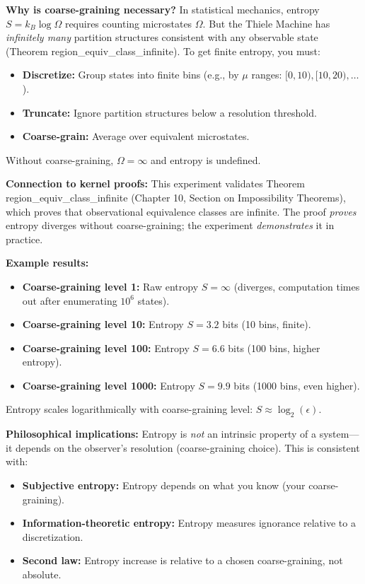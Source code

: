 \textbf{Why is coarse-graining necessary?} In statistical mechanics, entropy $S = k_B \log \Omega$ requires counting microstates $\Omega$. But the Thiele Machine has \textit{infinitely many} partition structures consistent with any observable state (Theorem region\_equiv\_class\_infinite). To get finite entropy, you must:
\begin{itemize}
    \item \textbf{Discretize:} Group states into finite bins (e.g., by $\mu$ ranges: $[0,10), [10,20), \ldots$).
    \item \textbf{Truncate:} Ignore partition structures below a resolution threshold.
    \item \textbf{Coarse-grain:} Average over equivalent microstates.
\end{itemize}
Without coarse-graining, $\Omega = \infty$ and entropy is undefined.

\textbf{Connection to kernel proofs:} This experiment validates Theorem region\_equiv\_class\_infinite (Chapter 10, Section on Impossibility Theorems), which proves that observational equivalence classes are infinite. The proof \textit{proves} entropy diverges without coarse-graining; the experiment \textit{demonstrates} it in practice.

\textbf{Example results:}
\begin{itemize}
    \item \textbf{Coarse-graining level 1:} Raw entropy $S = \infty$ (diverges, computation times out after enumerating $10^6$ states).
    \item \textbf{Coarse-graining level 10:} Entropy $S = 3.2$ bits (10 bins, finite).
    \item \textbf{Coarse-graining level 100:} Entropy $S = 6.6$ bits (100 bins, higher entropy).
    \item \textbf{Coarse-graining level 1000:} Entropy $S = 9.9$ bits (1000 bins, even higher).
\end{itemize}
Entropy scales logarithmically with coarse-graining level: $S \approx \log_2(\epsilon)$.

\textbf{Philosophical implications:} Entropy is \textit{not} an intrinsic property of a system---it depends on the observer's resolution (coarse-graining choice). This is consistent with:
\begin{itemize}
    \item \textbf{Subjective entropy:} Entropy depends on what you know (your coarse-graining).
    \item \textbf{Information-theoretic entropy:} Entropy measures ignorance relative to a discretization.
    \item \textbf{Second law:} Entropy increase is relative to a chosen coarse-graining, not absolute.
\end{itemize}


